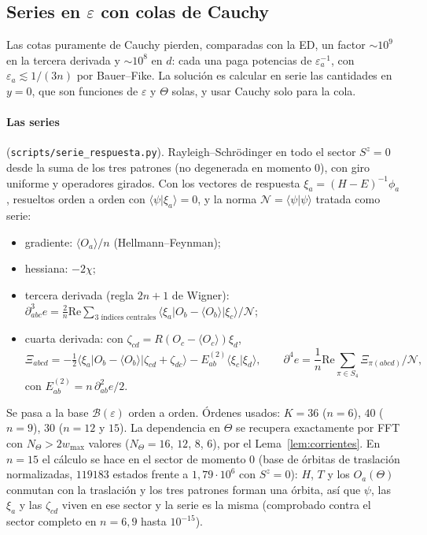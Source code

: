 \documentclass[11pt,a4paper]{article}
\theoremstyle{definition}
\theoremstyle{remark}
\newcommand{\ev}[1]{\langle #1\rangle}
\newcommand{\eps}{\varepsilon}
\newcommand{\scr}[1]{\texttt{scripts/#1}}
\begin{document}
\subsection{Series en $\eps$ con colas de Cauchy}

Las cotas puramente de Cauchy pierden, comparadas con la ED, un factor $\sim10^9$ en la tercera
derivada y $\sim10^8$ en $d$: cada una paga potencias de $\eps_a^{-1}$, con $\eps_a\lesssim1/(3n)$ por
Bauer--Fike. La solución es calcular en serie las cantidades en $y=0$, que son funciones de $\eps$ y
$\Theta$ solas, y usar Cauchy solo para la cola.

\paragraph{Las series} (\scr{serie\_respuesta.py}). Rayleigh--Schrödinger en todo el sector $S^z=0$
desde la suma de los tres patrones (no degenerada en momento $0$), con giro uniforme y operadores girados.
Con los vectores de respuesta $\xi_a=(H-E)^{-1}\phi_a$, resueltos orden a orden con
$\ev{\psi|\xi_a}=0$, y la norma $\mathcal N=\ev{\psi|\psi}$ tratada como serie:
\begin{itemize}
\item gradiente: $\ev{O_a}/n$ (Hellmann--Feynman);
\item hessiana: $-2\chi$;
\item tercera derivada (regla $2n+1$ de Wigner):
  $\partial^3_{abc}e=\frac2n\mathrm{Re}\sum_{\text{3 índices centrales}}\ev{\xi_a|O_b-\ev{O_b}|\xi_c}/\mathcal N$;
\item cuarta derivada: con $\zeta_{cd}=R(O_c-\ev{O_c})\xi_d$,
  \[
    \Xi_{abcd}=-\tfrac12\ev{\xi_a|O_b-\ev{O_b}|\zeta_{cd}+\zeta_{dc}}-E^{(2)}_{ab}\ev{\xi_c|\xi_d},
    \qquad \partial^4e=\frac1n\mathrm{Re}\sum_{\pi\in S_4}\Xi_{\pi(abcd)}/\mathcal N,
  \]
  con $E^{(2)}_{ab}=n\,\partial^2_{ab}e/2$.
\end{itemize}
Se pasa a la base $\mathcal B(\eps)$ orden a orden. Órdenes usados: $K=36$ ($n=6$), $40$ ($n=9$), $30$
($n=12$ y $15$). La dependencia en $\Theta$ se recupera exactamente por FFT con $N_\Theta>2w_{\max}$ valores
($N_\Theta=16$, $12$, $8$, $6$), por el Lema~\ref{lem:corrientes}. En $n=15$ el cálculo se hace en el sector
de momento $0$ (base de órbitas de traslación normalizadas, $119183$ estados frente a $1{,}79\cdot10^6$
con $S^z=0$): $H$, $T$ y los $O_a(\Theta)$ conmutan con la traslación y los tres patrones forman una
órbita, así que $\psi$, las $\xi_a$ y las $\zeta_{cd}$ viven en ese sector y la serie es la misma
(comprobado contra el sector completo en $n=6,9$ hasta $10^{-15}$).
\end{document}
